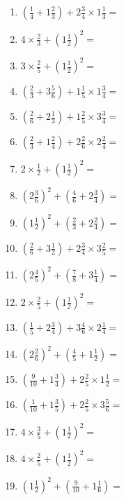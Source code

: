 \documentclass[12pt]{article}
\begin{document}
\begin{enumerate}
\item \large $ (\frac{1}{4} + 1 \frac{2}{3}) + 2 \frac{3}{4} \times 1 \frac{1}{3} = $ \vspace{1.8cm}
\item \large $ 4 \times \frac{2}{3} + (1 \frac{1}{2})^2 = $ \vspace{1.8cm}
\item \large $ 3 \times \frac{2}{5} + (1 \frac{1}{2})^2 = $ \vspace{1.8cm}
\item \large $ (\frac{2}{3} + 3 \frac{5}{6}) + 1 \frac{1}{5} \times 1 \frac{3}{4} = $ \vspace{1.8cm}
\item \large $ (\frac{2}{6} + 2 \frac{1}{3}) + 1 \frac{2}{5} \times 3 \frac{3}{4} = $ \vspace{1.8cm}
\item \large $ (\frac{2}{3} + 1 \frac{2}{4}) + 2 \frac{2}{6} \times 2 \frac{2}{4} = $ \vspace{1.8cm}
\item \large $ 2 \times \frac{1}{2} + (1 \frac{1}{2})^2 = $ \vspace{1.8cm}
\item \large $ (2 \frac{3}{6})^2 + (\frac{4}{6} + 2 \frac{3}{4}) = $ \vspace{1.8cm}
\item \large $ (1 \frac{1}{2})^2 + (\frac{2}{3} + 2 \frac{2}{4}) = $ \vspace{1.8cm}
\newpage
\item \large $ (\frac{2}{6} + 3 \frac{1}{2}) + 2 \frac{3}{4} \times 3 \frac{2}{5} = $ \vspace{1.8cm}
\item \large $ (2 \frac{4}{5})^2 + (\frac{7}{8} + 3 \frac{1}{4}) = $ \vspace{1.8cm}
\item \large $ 2 \times \frac{2}{5} + (1 \frac{1}{2})^2 = $ \vspace{1.8cm}
\item \large $ (\frac{1}{5} + 2 \frac{3}{4}) + 3 \frac{4}{6} \times 2 \frac{1}{4} = $ \vspace{1.8cm}
\item \large $ (2 \frac{2}{6})^2 + (\frac{4}{5} + 1 \frac{1}{2}) = $ \vspace{1.8cm}
\item \large $ (\frac{9}{10} + 1 \frac{3}{4}) + 2 \frac{2}{5} \times 1 \frac{1}{2} = $ \vspace{1.8cm}
\item \large $ (\frac{1}{10} + 1 \frac{3}{5}) + 2 \frac{2}{5} \times 3 \frac{5}{6} = $ \vspace{1.8cm}
\item \large $ 4 \times \frac{3}{5} + (1 \frac{1}{2})^2 = $ \vspace{1.8cm}
\item \large $ 4 \times \frac{2}{5} + (1 \frac{1}{2})^2 = $ \vspace{1.8cm}
\item \large $ (1 \frac{1}{2})^2 + (\frac{9}{10} + 1 \frac{1}{6}) = $ \vspace{1.8cm}
\end{enumerate}\newpage
\end{document}
